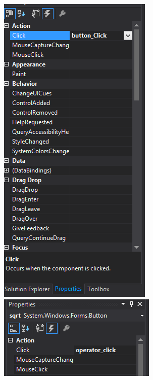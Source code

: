 \begin{center}
\includegraphics[scale=1]{images/button_click}
\includegraphics[scale=1]{images/operator_click}
\end{center}
\begin{flushleft}

\end{flushleft}

